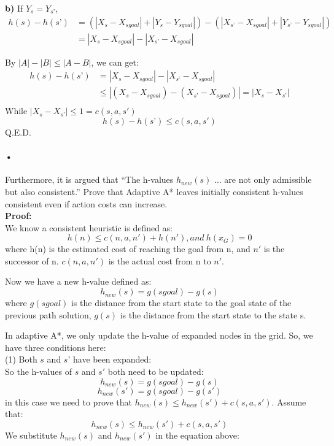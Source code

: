 \documentclass[11pt]{report}
\begin{document}
\indent \textbf{b)} If $Y_s = Y_{s’}$,
\begin{align*}
h(s) - h(s’) 
& =(|X_s -X_{sgoal}| + |Y_s -Y_{sgoal}|) - (|X_{s’} -X_{sgoal}| + |Y_{s’} -Y_{sgoal}|)  \\
& = |X_s -X_{sgoal}| - |X_{s’} -X_{sgoal}|
\end{align*}

\noindent By $|A| - |B| \leq |A-B|$, we can get:
\begin{align*}
h(s) - h(s’) 
& =|X_s -X_{sgoal}| - |X_{s’} -X_{sgoal}| \\
& \leq |(X_s -X_{sgoal}) - (X_{s’} - X_{sgoal})| = |X_s - X_{s’} | \\
\end{align*}
While $|X_s - X_{s’} | \leq 1 = c(s, a, s')$
$$h(s) - h(s’) \leq c(s, a, s')$$
\hspace{20mm} Q.E.D.\\


\paragraph{•}
Furthermore, it is argued that “The h-values $h_{new}(s)$ ... are not only admissible but also consistent.” Prove that Adaptive A* leaves initially consistent h-values consistent even if action costs can increase.\\

\textbf{Proof:}\\

We know a consistent heuristic is defined as:
$$h(n) \leq c(n, a, n')+h(n'), and\ h(x_G)=0$$ where h(n) is the estimated cost of reaching the goal from n, and $n'$ is the successor of n. $c(n, a, n')$ is the actual cost from n to $n'$.

Now we have a new h-value defined as:$$h_{new}(s) = g(sgoal) - g(s)$$ where $g(sgoal)$ is the distance from the start state to the goal state of the previous path solution, $g(s)$ is the distance from the start state to the state s.

In adaptive A*, we only update the h-value of expanded nodes in the grid. So, we have three conditions here:\\

(1) Both $s$ and $s’$ have been expanded:\\

So the h-values of $s$ and $s'$ both need to be updated:
$$h_{new}(s ) = g(sgoal) - g(s)$$
$$h_{new}(s' ) = g(sgoal) - g(s')$$
in this case we need to prove that $h_{new}(s) \leq h_{new}(s') + c(s,a,s')  $.
Assume that:
 $$h_{new}(s) \leq h_{new}(s') + c(s,a,s')  $$
We substitute $h_{new}(s)$ and $h_{new}(s')$ in the equation above:
\end{document}
